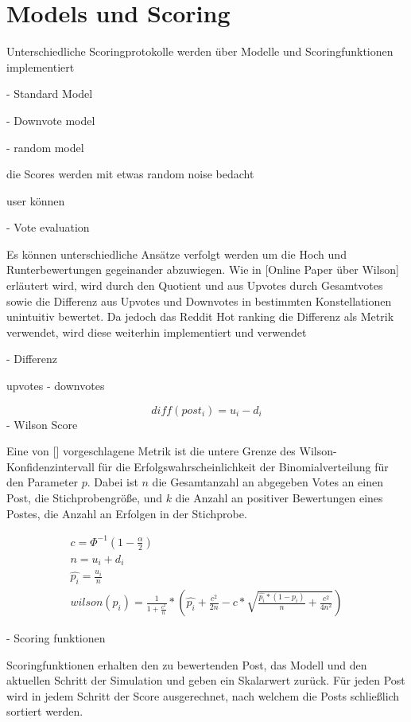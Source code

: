 \chapter{Models und Scoring}

Unterschiedliche Scoringprotokolle werden über Modelle und Scoringfunktionen implementiert

- Standard Model



- Downvote model


- random model 

die Scores werden mit etwas random noise bedacht

user können 


-  Vote evaluation

	Es können unterschiedliche Ansätze verfolgt werden um die Hoch und Runterbewertungen gegeinander abzuwiegen. 
	Wie in [Online Paper über Wilson] erläutert wird, wird durch den Quotient und aus Upvotes durch Gesamtvotes sowie die Differenz aus Upvotes und Downvotes in bestimmten Konstellationen unintuitiv bewertet. Da jedoch das Reddit Hot ranking die Differenz als Metrik verwendet, wird diese weiterhin implementiert und verwendet
	
- Differenz
	
	upvotes - downvotes
	
\begin{equation}
diff(post_{i}) = u_{i} - d_{i}
\end{equation}
- Wilson Score

	Eine von [] vorgeschlagene Metrik ist die untere Grenze des Wilson-Konfidenzintervall für die Erfolgswahrscheinlichkeit der Binomialverteilung für den Parameter $p$. Dabei ist $n$ die Gesamtanzahl an abgegeben Votes an einen Post, die Stichprobengröße, und $k$ die Anzahl an positiver Bewertungen eines Postes, die Anzahl an Erfolgen in der Stichprobe.
	
\begin{align}
 c = \Phi^{-1}(1 - \frac{\alpha}{2}) \\
 n = u_{i} + d_{i} \\
 \hat{p_{i}} = \frac{u_{i}}{n}  \\
 wilson(p_{i}) = \frac{1}{1+\frac{c^2}{n}}*(\hat{p_{i}} + \frac{c^2}{2n} - c* \sqrt{\frac{\hat{p_{i}}*(1 - \hat{p_{i}})}{n} + \frac{c^2}{4n^2}})
\end{align}
	
	

- Scoring funktionen


Scoringfunktionen erhalten den zu bewertenden Post, das Modell und den aktuellen Schritt der Simulation und geben ein Skalarwert zurück.
Für jeden Post wird in jedem Schritt der Score ausgerechnet, nach welchem die Posts schließlich sortiert werden.


